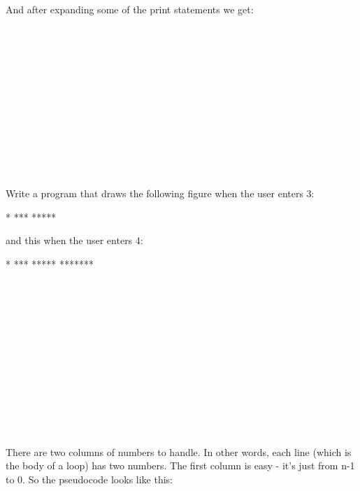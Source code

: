\begin{console}
\begin{ex}
And after expanding some of the print statements we get:

\\
\\
\\
\\
\\
\\
\\
\\
\\
\\
\\

\end{ex}
\begin{ex} Write a program that draws the following figure when
the user enters 3:
\begin{console}
  *
 ***
*****
\end{console}
and this when the user enters 4:
\begin{console}
   *
  ***
 *****
*******
\end{console}

\\\\
     \\
     \\
     \\\\
\\\\
     \\
     \\
     \\
     \\

There are two columns of numbers to handle. In other words, each line
(which is the body of a loop) has two numbers. The first column is easy - it's just from n-1 to 0. So the pseudocode looks like this:

    \\
          \\


\end{ex}
\end{console}
